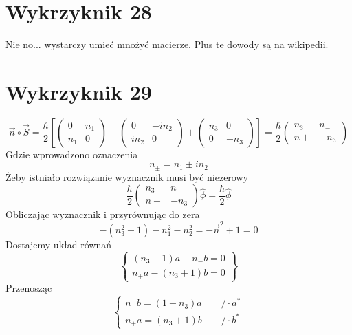 \documentclass[a4paper,12pt]{article}
\begin{document}
\section{Wykrzyknik 28}
	Nie no... wystarczy umieć mnożyć macierze.
  Plus te dowody są na wikipedii.

\section{Wykrzyknik 29}
\begin{equation*}
  \vec{n} \circ \vec{S} = \frac{\hbar}{2} \left[ \begin{pmatrix} 0 & n_1 \\ n_1 &
      0 \end{pmatrix} + \begin{pmatrix} 0 & -in_2 \\ in_2 & 0 \end{pmatrix}
    + \begin{pmatrix} n_3 & 0 \\ 0 & -n_3 \end{pmatrix} \right] =
    \frac{\hbar}{2} \begin{pmatrix} n_3 & n_{-} \\ n{+} & -n_3 \end{pmatrix}
\end{equation*}
Gdzie wprowadzono oznaczenia
\begin{equation*}
  n_{\pm} = n_1 \pm in_2
\end{equation*}
Żeby istniało rozwiązanie wyznacznik musi być niezerowy
\begin{equation*}
  \frac{\hbar}{2} \begin{pmatrix} n_3 & n_{-} \\ n{+} & -n_3 \end{pmatrix}
  \hat{\phi} =
  \frac{\hbar}{2} \hat{\phi}
\end{equation*}
Obliczając wyznacznik i przyrównując do zera
\begin{equation*}
  -\left( n_3^2 -1\right) -n_1^2 - n_2^2 = -\vec{n}^2 + 1 = 0
\end{equation*}
Dostajemy układ równań
\begin{equation*}
  \left\{ \begin{gathered}
      (n_3 - 1)a + n_{-} b = 0\\
      n_{+} a - (n_3 +1) b = 0
  \end{gathered} \right\}
\end{equation*}
Przenosząc
\begin{equation*}
  \left\{\begin{gathered}
      n_{-} b = (1-n_3)a \qquad /\cdot a^*\\
      n_{+} a =  (n_3 +1) b \qquad /\cdot b^*
  \end{gathered}\right.
\end{equation*}
\end{document}
